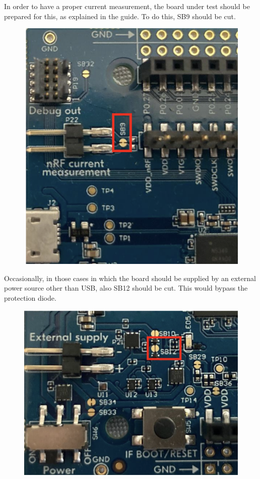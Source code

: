 \documentclass{Configuration_Files/PoliMi3i_thesis}
\begin{document}
In order to have a proper current measurement, the board under test should be prepared for this, as explained in the guide.
To do this, SB9 should be cut.


\begin{figure}[H]
    \centering
    \includegraphics[scale=0.3]{Test_Procedure/15.png}
    \label{fig:direct_communication_board_PC}
\end{figure}

Occasionally, in those cases in which the board should be supplied by an external power source other than USB, also SB12 should be cut. This would bypass the protection diode.

\begin{figure}[H]
    \centering
    \includegraphics[scale=0.3]{Test_Procedure/16.png}
    \label{fig:direct_communication_board_PC}
\end{figure}
\end{document}
